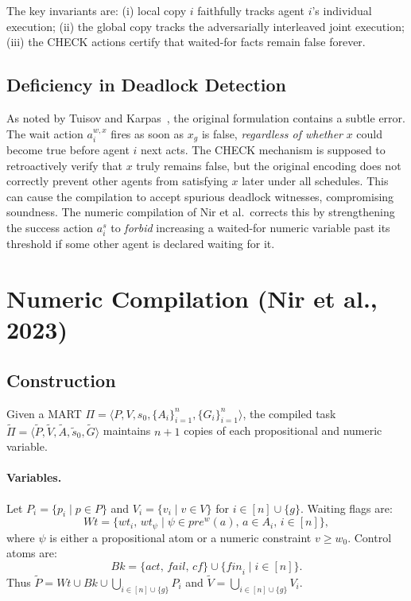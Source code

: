 \documentclass{article}
\theoremstyle{definition}
\newcommand{\prew}{\mathit{pre}^w}
\newcommand{\fail}{\mathit{fail}}
\newcommand{\act}{\mathit{act}}
\newcommand{\fin}{\mathit{fin}}
\newcommand{\cf}{\mathit{cf}}
\newcommand{\wt}{\mathit{wt}}
\begin{document}
The key invariants are: (i) local copy $i$ faithfully tracks agent $i$'s individual execution; (ii) the global copy tracks the adversarially interleaved joint execution; (iii) the CHECK actions certify that waited-for facts remain false forever.

\subsection{Deficiency in Deadlock Detection}

As noted by Tuisov and Karpas~\cite{tuisov2020}, the original formulation contains a subtle error. The wait action $a_i^{w,x}$ fires as soon as $x_g$ is false, \emph{regardless of whether} $x$ could become true before agent $i$ next acts. The CHECK mechanism is supposed to retroactively verify that $x$ truly remains false, but the original encoding does not correctly prevent other agents from satisfying $x$ later under all schedules. This can cause the compilation to accept spurious deadlock witnesses, compromising soundness. The numeric compilation of Nir et al.\ corrects this by strengthening the success action $a_i^s$ to \emph{forbid} increasing a waited-for numeric variable past its threshold if some other agent is declared waiting for it.

\section{Numeric Compilation (Nir et al., 2023)}

\subsection{Construction}

Given a MART $\Pi = \langle P, V, s_0, \{A_i\}_{i=1}^n, \{G_i\}_{i=1}^n \rangle$, the compiled task $\widetilde{\Pi} = \langle \widetilde{P}, \widetilde{V}, \widetilde{A}, \widetilde{s}_0, \widetilde{G} \rangle$ maintains $n+1$ copies of each propositional and numeric variable.

\paragraph{Variables.}
Let $P_i = \{p_i \mid p \in P\}$ and $V_i = \{v_i \mid v \in V\}$ for $i \in [n] \cup \{g\}$. Waiting flags are:
\[
  Wt = \{\wt_i,\, \wt_\psi \mid \psi \in \prew(a),\, a \in A_i,\, i \in [n]\},
\]
where $\psi$ is either a propositional atom or a numeric constraint $v \geq w_0$. Control atoms are:
\[
  Bk = \{\act,\, \fail,\, \cf\} \cup \{\fin_i \mid i \in [n]\}.
\]
Thus $\widetilde{P} = Wt \cup Bk \cup \bigcup_{i \in [n] \cup \{g\}} P_i$ and $\widetilde{V} = \bigcup_{i \in [n] \cup \{g\}} V_i$.
\end{document}
